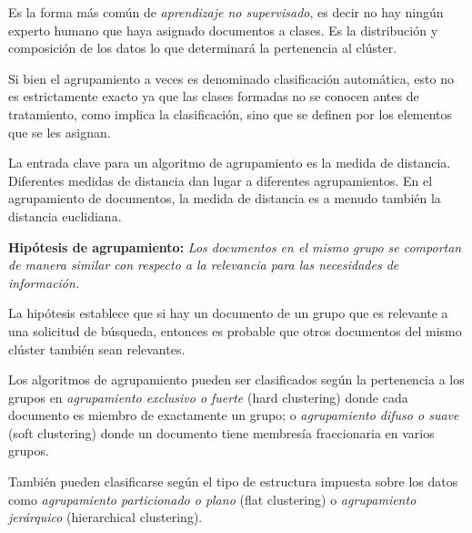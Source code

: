 \documentclass{llncs}
\begin{document}
Es la forma más común de \textit{aprendizaje no supervisado}, es decir no hay ningún experto humano que haya asignado documentos a clases. Es la distribución y composición de los datos lo que determinará la pertenencia al clúster. 

Si bien el agrupamiento a veces es denominado clasificación automática, esto no es estrictamente exacto ya que las clases formadas no se conocen antes de tratamiento, como implica la clasificación, sino que se definen por los elementos que se les asignan.

La entrada clave para un algoritmo de agrupamiento es la medida de distancia. Diferentes medidas de distancia dan lugar a diferentes agrupamientos. En el agrupamiento de documentos, la medida de distancia es a menudo también la distancia euclidiana. 

\vspace{1em}
\textbf{Hip\'otesis de agrupamiento:} \textit{Los documentos en el mismo grupo se comportan de manera similar con respecto a la relevancia para las necesidades de información.}
	
\vspace{0.3em}
La hipótesis establece que si hay un documento de un grupo que es relevante a una solicitud de búsqueda, entonces es probable que otros documentos del mismo clúster también sean relevantes. 
\vspace{1em}

Los algoritmos de agrupamiento pueden ser clasificados seg\'un la pertenencia a los grupos en \textit{agrupamiento exclusivo o fuerte} (hard clustering) donde cada documento es miembro de exactamente un grupo; o \textit{agrupamiento difuso o suave} (soft clustering) donde un documento tiene membresía fraccionaria en varios grupos.

Tambi\'en pueden clasificarse seg\'un el tipo de estructura impuesta sobre los datos como \textit{agrupamiento particionado o plano} (flat clustering) o \textit{agrupamiento jer\'arquico} (hierarchical clustering).
\end{document}
